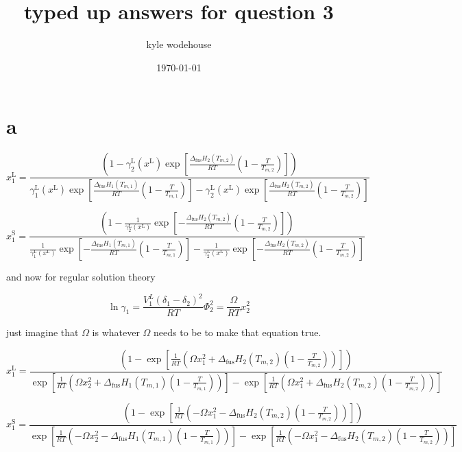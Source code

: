\documentclass{article}
\title{typed up answers for question 3}
\author{kyle wodehouse}
\date{\today}
\begin{document}
\maketitle

\section{a}
\Large
\[
x_1^{\text{L}} =
\frac{
\left(1 - \gamma_2^{\text{L}}(x^{\text{L}}) 
\exp\left[ \frac{\Delta_{\text{fus}} H_2 (T_{m,2})}{RT} \left( 1 - \frac{T}{T_{m,2}} \right) \right] \right)
}
{
\gamma_1^{\text{L}}(x^{\text{L}}) 
\exp\left[ \frac{\Delta_{\text{fus}} H_1 (T_{m,1})}{RT} \left( 1 - \frac{T}{T_{m,1}} \right) \right]
- \gamma_2^{\text{L}}(x^{\text{L}})
\exp\left[ \frac{\Delta_{\text{fus}} H_2 (T_{m,2})}{RT} \left( 1 - \frac{T}{T_{m,2}} \right) \right]
}
\]

\[
x_1^{\text{S}} =
\frac{
\left(1 - \frac{1}{\gamma_2^{\text{L}}(x^{\text{L}})} 
\exp\left[ -\frac{\Delta_{\text{fus}} H_2 (T_{m,2})}{RT} \left( 1 - \frac{T}{T_{m,2}} \right) \right] \right)
}
{
\frac{1}{\gamma_1^{\text{L}}(x^{\text{L}})} 
\exp\left[ -\frac{\Delta_{\text{fus}} H_1 (T_{m,1})}{RT} \left( 1 - \frac{T}{T_{m,1}} \right) \right]
- \frac{1}{\gamma_2^{\text{L}}(x^{\text{L}})} 
\exp\left[ -\frac{\Delta_{\text{fus}} H_2 (T_{m,2})}{RT} \left( 1 - \frac{T}{T_{m,2}} \right) \right]
}
\]

and now for regular solution theory

\[ \ln \gamma_1 = \frac{V_1^L (\delta_1 - \delta_2)^2}{RT} \Phi_2^2 = \frac{\Omega}{RT} x_2^2 \tag{1}\]

just imagine that $\Omega$ is whatever $\Omega$ needs to be to make that equation true.

\large

\[
x_1^{\text{L}} =
\frac{
\left(1 - \exp \left[
\frac{1}{RT} \left(
\Omega x_1^2 + \Delta_{\text{fus}} H_2 (T_{m,2}) \left(1 - \frac{T}{T_{m,2}} \right)
\right)
\right] \right)
}
{
\exp \left[
\frac{1}{RT} \left(
\Omega x_2^2 + \Delta_{\text{fus}} H_1 (T_{m,1}) \left(1 - \frac{T}{T_{m,1}} \right)
\right)
\right]
-
\exp \left[
\frac{1}{RT} \left(
\Omega x_1^2 + \Delta_{\text{fus}} H_2 (T_{m,2}) \left(1 - \frac{T}{T_{m,2}} \right)
\right)
\right]
}
\]

\[
x_1^{\text{S}} =
\frac{
\left(1 - \exp \left[
\frac{1}{RT} \left(
-\Omega x_1^2 - \Delta_{\text{fus}} H_2 (T_{m,2}) \left(1 - \frac{T}{T_{m,2}} \right)
\right)
\right] \right)
}
{
\exp \left[
\frac{1}{RT} \left(
-\Omega x_2^2 - \Delta_{\text{fus}} H_1 (T_{m,1}) \left(1 - \frac{T}{T_{m,1}} \right)
\right)
\right]
-
\exp \left[
\frac{1}{RT} \left(
-\Omega x_1^2 - \Delta_{\text{fus}} H_2 (T_{m,2}) \left(1 - \frac{T}{T_{m,2}} \right)
\right)
\right]
}
\]
\end{document}
